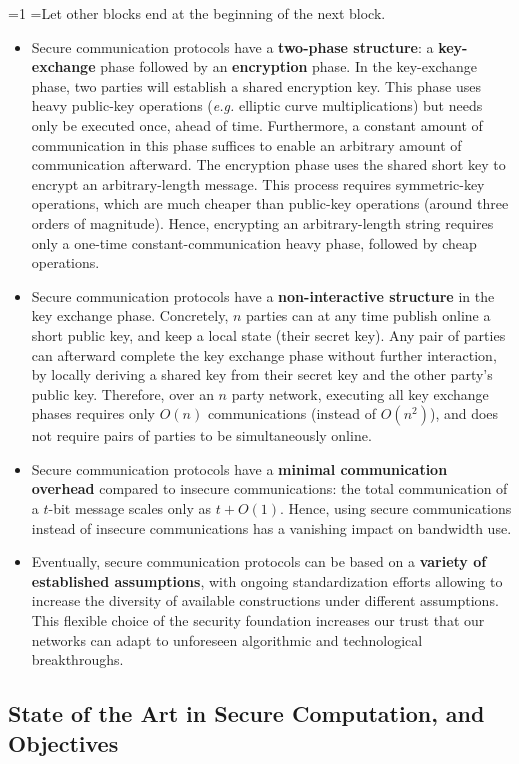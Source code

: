 \documentclass[oneside, a4paper, onecolumn, 11pt]{article}
\newcounter{alphasect}
\def\alphainsection{0}
\newenvironment{alphasection}{%
  \ifnum\alphainsection=1%
    \errhelp={Let other blocks end at the beginning of the next block.}
    \errmessage{Nested Alpha section not allowed}
  \fi%
  \setcounter{alphasect}{0}
  \def\alphainsection{1}
}{%
  \setcounter{alphasect}{0}
  \def\alphainsection{0}
}%
\begin{document}
\begin{alphasection}
\begin{itemize}
    \item Secure communication protocols have a \textbf{two-phase structure}: a \textbf{key-exchange} phase followed by an \textbf{encryption} phase. In the key-exchange phase, two parties will establish a shared encryption key. This phase uses heavy public-key operations (\emph{e.g.} elliptic curve multiplications) but needs only be executed once, ahead of time. Furthermore, a constant amount of communication in this phase suffices to enable an arbitrary amount of communication afterward. The encryption phase uses the shared short key to encrypt an arbitrary-length message. This process requires symmetric-key operations, which are much cheaper than public-key operations (around three orders of magnitude). Hence, encrypting an arbitrary-length string requires only a one-time constant-communication heavy phase, followed by cheap operations.
    \item Secure communication protocols have a \textbf{non-interactive structure} in the key exchange phase. Concretely, $n$ parties can at any time publish online a short public key, and keep a local state (their secret key). Any pair of parties can afterward complete the key exchange phase without further interaction, by locally deriving a shared key from their secret key and the other party's public key. Therefore, over an $n$ party network, executing all key exchange phases requires only $O(n)$ communications (instead of $O(n^2)$), and does not require pairs of parties to be simultaneously online.
    \item Secure communication protocols have a \textbf{minimal communication overhead} compared to insecure communications: the total communication of a $t$-bit message scales only as $t + O(1)$. Hence, using secure communications instead of insecure communications has a vanishing impact on bandwidth use.
    \item Eventually, secure communication protocols can be based on a \textbf{variety of established assumptions}, with ongoing standardization efforts allowing to increase the diversity of available constructions under different assumptions. This flexible choice of the security foundation increases our trust that our networks can adapt to unforeseen algorithmic and technological breakthroughs.
\end{itemize}

\subsection{State of the Art in Secure Computation, and Objectives}
\label{sub:sota}


\end{alphasection}
\end{document}
